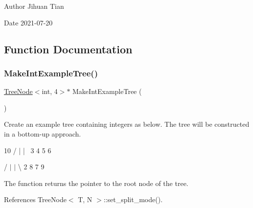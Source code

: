 \begin{DoxyAuthor}{Author}
Jihuan Tian 
\end{DoxyAuthor}
\begin{DoxyDate}{Date}
2021-\/07-\/20 
\end{DoxyDate}


\subsection{Function Documentation}
\mbox{\label{quad-tree-copy_8cc_a403caebc7e08d6f14b584539580851d5}} 
\subsubsection{\texorpdfstring{Make\+Int\+Example\+Tree()}{MakeIntExampleTree()}}
{\footnotesize\ttfamily \hyperlink{classTreeNode}{Tree\+Node}$<$int, 4$>$$\ast$ Make\+Int\+Example\+Tree (\begin{DoxyParamCaption}{ }\end{DoxyParamCaption})}

Create an example tree containing integers as below. The tree will be constructed in a bottom-\/up approach. \begin{DoxyVerb}      10
  /  |  |  \
 3   4  5   6
\end{DoxyVerb}
 / $\vert$ $\vert$ \textbackslash{} 2 8 7 9

The function returns the pointer to the root node of the tree. 

References Tree\+Node$<$ T, N $>$\+::set\+\_\+split\+\_\+mode().

